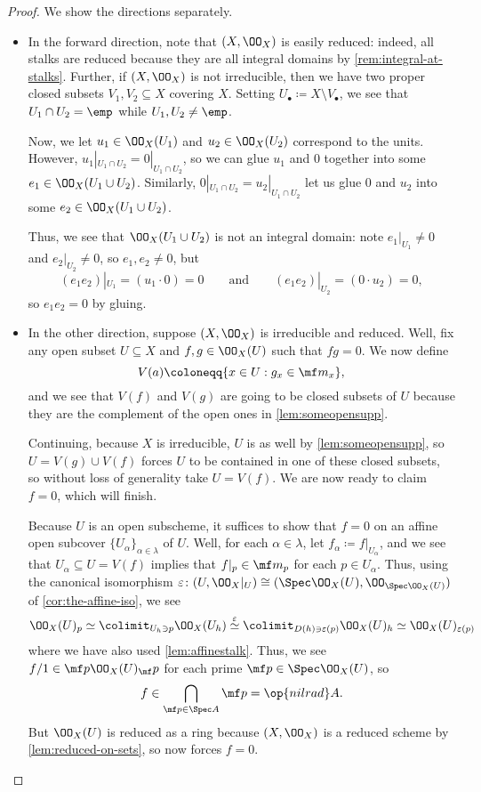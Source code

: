 \documentclass[../notes.tex]{subfiles}
\begin{document}
\begin{proof}
	We show the directions separately.
	\begin{itemize}
		\item In the forward direction, note that $(X,\OO_X)$ is easily reduced: indeed, all stalks are reduced because they are all integral domains by \autoref{rem:integral-at-stalks}. Further, if $(X,\OO_X)$ is not irreducible, then we have two proper closed subsets $V_1,V_2\subseteq X$ covering $X$. Setting $U_\bullet\coloneqq X\setminus V_\bullet$, we see that $U_1\cap U_2=\emp$ while $U_1,U_2\ne\emp$.

		Now, we let $u_1\in\OO_X(U_1)$ and $u_2\in\OO_X(U_2)$ correspond to the units. However, $u_1|_{U_1\cap U_2}=0|_{U_1\cap U_2}$, so we can glue $u_1$ and $0$ together into some $e_1\in\OO_X(U_1\cup U_2)$. Similarly, $0|_{U_1\cap U_2}=u_2|_{U_1\cap U_2}$ let us glue $0$ and $u_2$ into some $e_2\in\OO_X(U_1\cup U_2)$.

		Thus, we see that $\OO_X(U_1\cup U_2)$ is not an integral domain: note $e_1|_{U_1}\ne0$ and $e_2|_{U_2}\ne0$, so $e_1,e_2\ne0$, but
		\[(e_1e_2)|_{U_1}=(u_1\cdot0)=0\qquad\text{and}\qquad(e_1e_2)|_{U_2}=(0\cdot u_2)=0,\]
		so $e_1e_2=0$ by gluing.
		\item In the other direction, suppose $(X,\OO_X)$ is irreducible and reduced. Well, fix any open subset $U\subseteq X$ and $f,g\in\OO_X(U)$ such that $fg=0$. We now define
		\[V(a)\coloneqq\{x\in U:g_x\in\mf m_x\},\]
		and we see that $V(f)$ and $V(g)$ are going to be closed subsets of $U$ because they are the complement of the open ones in \autoref{lem:someopensupp}.
		
		Continuing, because $X$ is irreducible, $U$ is as well by \autoref{lem:someopensupp}, so $U= V(g)\cup V(f)$ forces $U$ to be contained in one of these closed subsets, so without loss of generality take $U=V(f)$. We are now ready to claim $f=0$, which will finish.
		
		Because $U$ is an open subscheme, it suffices to show that $f=0$ on an affine open subcover $\{U_\alpha\}_{\alpha\in\lambda}$ of $U$. Well, for each $\alpha\in\lambda$, let $f_\alpha\coloneqq f|_{U_\alpha}$, and we see that $U_\alpha\subseteq U=V(f)$ implies that $f|_p\in\mf m_p$ for each $p\in U_\alpha$. Thus, using the canonical isomorphism $\varepsilon\colon(U,\OO_X|_U)\cong(\Spec\OO_X(U),\OO_{\Spec\OO_X(U)})$ of \autoref{cor:the-affine-iso}, we see
		\[\OO_X(U)_p\simeq\colimit_{U_h\ni p}\OO_X(U_h)\stackrel\varepsilon\simeq\colimit_{D(h)\ni\varepsilon(p)}\OO_X(U)_h\simeq\OO_X(U)_{\varepsilon(p)}\]
		where we have also used \autoref{lem:affinestalk}. Thus, we see $f/1\in\mf p\OO_X(U)_\mf p$ for each prime $\mf p\in\Spec\OO_X(U)$, so
		\[f\in\bigcap_{\mf p\in\Spec A}\mf p=\op{nilrad}A.\]
		But $\OO_X(U)$ is reduced as a ring because $(X,\OO_X)$ is a reduced scheme by \autoref{lem:reduced-on-sets}, so now forces $f=0$.
		\qedhere
	\end{itemize}
\end{proof}
\end{document}
